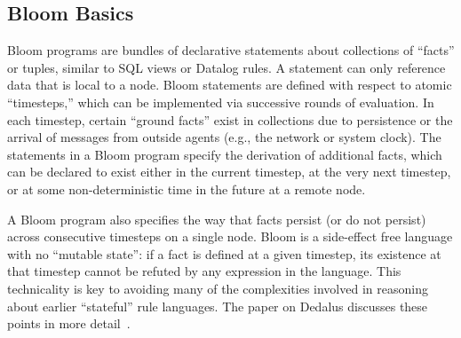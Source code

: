\subsection{Bloom Basics}
Bloom programs are bundles of declarative statements about collections of
``facts'' or tuples, similar to SQL views or Datalog rules.  A statement
can only reference data that is local to a node.  Bloom statements are defined
with respect to atomic ``timesteps,'' which can be implemented via successive
rounds of evaluation. In each timestep, certain ``ground facts'' exist in
collections due to persistence or the arrival of messages from outside agents
(e.g., the network or system clock).  The statements in a Bloom program specify
the derivation of additional facts, which can be declared to exist either in the
current timestep, at the very next timestep, or at some non-deterministic time
in the future at a remote node.

A Bloom program also specifies the way that facts persist (or do not persist)
across consecutive timesteps on a single node.  Bloom is a side-effect free
language with no ``mutable state'': if a fact is defined at a given timestep,
its existence at that timestep cannot be refuted by any expression in the
language.  This technicality is key to avoiding many of the complexities
involved in reasoning about earlier ``stateful'' rule languages.  The paper on
Dedalus discusses these points in more detail~\cite{dedalus}.

